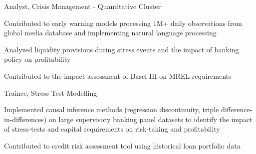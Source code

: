 \documentclass{practical-resume}
\begin{document}
	\begin{position}{Analyst, }{Crisis Management - Quantitative Cluster}
			\item Contributed to early warning models processing 1M+ daily observations from global media database and implementing natural language processing
			\item Analyzed liquidity provisions during stress events and the impact of banking policy on profitability
			\item Contributed to the impact assessment of Basel III on MREL requirements
	\end{position}
	
	\begin{position}{Trainee, }{Stress Test Modelling}
		\item Implemented causal inference methods (regression discontinuity, triple difference-in-differences) on large supervisory banking panel datasets to identify the impact of stress-tests and capital requirements on risk-taking and profitability
		\item Contributed to credit risk assessment tool using historical loan portfolio data
	\end{position}
	
\vspace{-0.4em}
\end{document}

